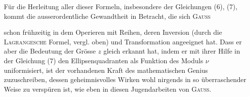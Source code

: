 Für die Herleitung aller dieser Formeln, insbesondere der Gleichungen
(6), (7), kommt die ausserordentliche Gewandtheit in Betracht, die sich \textsc{Gauss}\par
\clearpage{}
\noindent schon frühzeitig in dem Operieren mit Reihen, deren Inversion (durch die
\textsc{Lagrangesche} Formel, vergl. oben) und Transformation angeeignet hat. Dass
er aber die Bedeutung der Grösse \(z\) gleich erkannt hat, indem er mit ihrer
Hilfe in der Gleichung (7) den Ellipsenquadranten als Funktion des Moduls \(\nu\)
uniformisiert, ist der vorhandenen Kraft des mathematischen Genius zuzuschreiben,
dessen geheimnisvolles Wirken wohl nirgends in so überraschender
Weise zu verspüren ist, wie eben in diesen Jugendarbeiten von \textsc{Gauss}.

